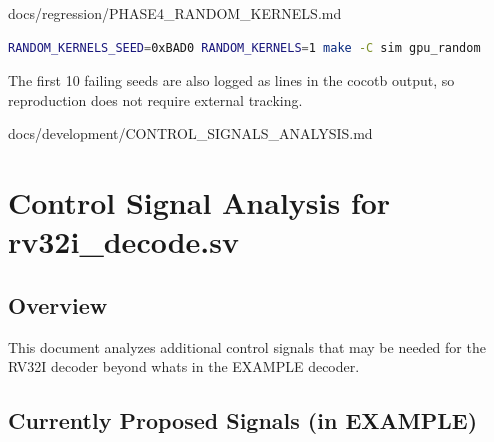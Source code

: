 \begin{relocated}{docs/regression/PHASE4_RANDOM_KERNELS.md}
\begin{lstlisting}[language=bash]
RANDOM_KERNELS_SEED=0xBAD0 RANDOM_KERNELS=1 make -C sim gpu_random
\end{lstlisting}

The first 10 failing seeds are also logged as  lines in the
cocotb output, so reproduction does not require external tracking.
\end{relocated}

\begin{relocated}{docs/development/CONTROL_SIGNALS_ANALYSIS.md}
\section{\texorpdfstring{Control Signal Analysis for
rv32i\_\allowbreak{}decode.sv}{Control Signal Analysis for rv32i\_decode.sv}}\label{tm:flow:control-signals-analysis}

\subsection{Overview}\label{tm:flow:control-signals-analysis:overview}

This document analyzes additional control signals that may be needed for
the RV32I decoder beyond what\textquotesingle s in the EXAMPLE decoder.

\subsection{Currently Proposed Signals (in EXAMPLE)}\label{tm:flow:control-signals-analysis:currently-proposed-signals-in-example}


\end{relocated}
